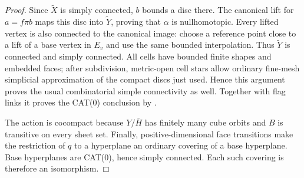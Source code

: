 \begin{proof}
Since \(\widetilde X\) is simply connected, \(b\) bounds a disc there.
The canonical lift for \(a=f\pi b\) maps this disc into
\(\widetilde Y\), proving that \(\alpha\) is nullhomotopic.
Every lifted vertex is also connected to the canonical image:
choose a reference point close to a lift of a base vertex in \(E_v\)
and use the same bounded interpolation.  Thus \(\widetilde Y\) is
connected and simply connected.  All cells have bounded finite shapes
and embedded faces; after subdivision, metric-open cell stars allow
ordinary fine-mesh simplicial approximation of the compact discs just
used.  Hence this argument proves the usual combinatorial simple
connectivity as well. Together with flag links it proves the CAT(0)
conclusion by \cite[Lecture~1, Section~1.2]{Sageev2014}.

The action is cocompact because \(Y/\bar H\) has finitely many cube
orbits and \(B\) is transitive on every sheet set.  Finally,
positive-dimensional face transitions make the restriction of \(q\)
to a hyperplane an ordinary covering of a base hyperplane.
Base hyperplanes are CAT(0), hence simply connected.  Each such
covering is therefore an isomorphism.
\end{proof}

